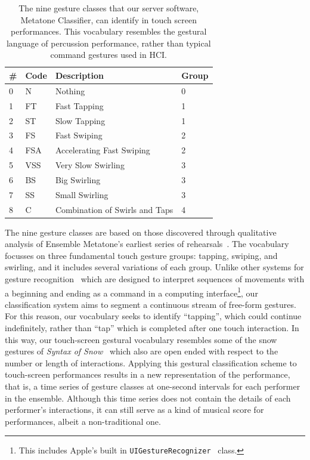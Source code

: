 \documentclass[graybox]{svmult}
\begin{document}
\begin{table}
\begin{center}
    \begin{tabular}{|l|l|l|l|}
    \hline
    \# & Code & Description & Group \\ \hline
    0 & N   & Nothing & 0 \\
    1 & FT  & Fast Tapping & 1\\
    2 & ST  & Slow Tapping & 1\\
    3 & FS  & Fast Swiping & 2\\
    4 & FSA & Accelerating Fast Swiping & 2\\
    5 & VSS & Very Slow Swirling & 3\\
    6 & BS  & Big Swirling & 3\\
    7 & SS  & Small Swirling & 3\\
    8 & C   & Combination of Swirls and Taps & 4\\ \hline
    \end{tabular}
\end{center}
\caption{The nine gesture classes that our server software, Metatone
  Classifier, can identify in touch screen performances. This
  vocabulary resembles the gestural language of percussion
  performance, rather than typical command gestures used in HCI.}
\label{tab:gesture-classes}
\end{table}


The nine gesture classes are based on those discovered through
qualitative analysis of Ensemble Metatone's earliest series of
rehearsals~\cite{Martin:2014jk}. The vocabulary focusses on three
fundamental touch gesture groups: tapping, swiping, and swirling, and
it includes several variations of each group. Unlike other systems for
gesture recognition~\cite{Wobbrock:2007kq} which are designed to
interpret sequences of movements with a beginning and ending as a
command in a computing interface\footnote{This includes Apple's built
  in \texttt{UIGestureRecognizer}~\cite{AppleDeveloper:2015rm}
  class.}, our classification system aims to segment a continuous
stream of free-form gestures. For this reason, our vocabulary seeks to
identify ``tapping'', which could continue indefinitely, rather than
``tap'' which is completed after one touch interaction. In this way,
our touch-screen gestural vocabulary resembles some of the snow
gestures of \emph{Syntax of Snow}~\cite{Burtner:2011fk} which also are
open ended with respect to the number or length of interactions.
Applying this gestural classification scheme to touch-screen
performances results in a new representation of the performance, that
is, a time series of gesture classes at one-second intervals for each
performer in the ensemble. Although this time series does not contain
the details of each performer's interactions, it can still serve as a
kind of musical score for performances, albeit a non-traditional one.
\end{document}
